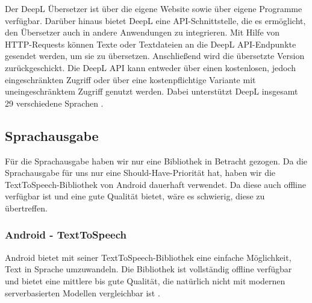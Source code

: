 Der DeepL Übersetzer ist über die eigene Website sowie über eigene Programme verfügbar. Darüber hinaus bietet DeepL eine API-Schnittstelle, die es ermöglicht, den Übersetzer auch in andere Anwendungen zu integrieren. Mit Hilfe von HTTP-Requests können Texte oder Textdateien an die DeepL API-Endpunkte gesendet werden, um sie zu übersetzen. Anschließend wird die übersetzte Version zurückgeschickt. Die DeepL API kann entweder über einen kostenlosen, jedoch eingeschränkten Zugriff oder über eine kostenpflichtige Variante mit uneingeschränktem Zugriff genutzt werden. Dabei unterstützt DeepL insgesamt 29 verschiedene Sprachen  \cite{deeplDocs}.

\subsection{Sprachausgabe}
Für die Sprachausgabe haben wir nur eine Bibliothek in Betracht gezogen. Da die Sprachausgabe für uns nur eine Should-Have-Priorität hat, haben wir die TextToSpeech-Bibliothek von Android dauerhaft verwendet. Da diese auch offline verfügbar ist und eine gute Qualität bietet, wäre es schwierig, diese zu übertreffen.

\subsubsection{Android - TextToSpeech}
Android bietet mit seiner TextToSpeech-Bibliothek eine einfache Möglichkeit, Text in Sprache umzuwandeln. Die Bibliothek ist vollständig offline verfügbar und bietet eine mittlere bis gute Qualität, die natürlich nicht mit modernen serverbasierten Modellen vergleichbar ist \cite{androidTTS}.